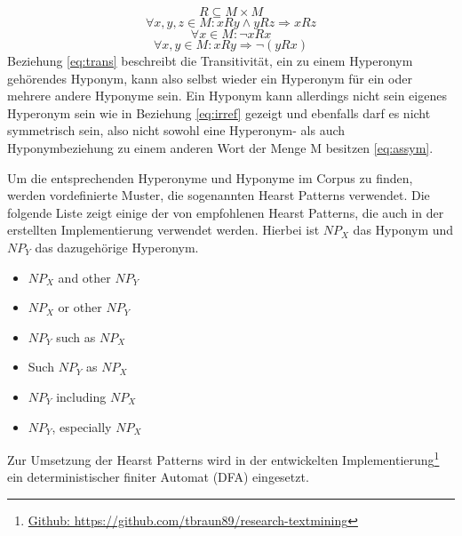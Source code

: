 \begin{equation}
  \label{eq:relation}
  R \subseteq M \times M
\end{equation}
\begin{equation}
  \label{eq:trans}
  \forall x, y, z \in M : xRy \land yRz \Rightarrow xRz
\end{equation}
\begin{equation}
  \label{eq:irref}
  \forall x \in M : \neg xRx
\end{equation}
\begin{equation}
  \label{eq:assym}
  \forall x, y \in M : xRy \Rightarrow \neg (yRx)
\end{equation}%
%
Beziehung \ref{eq:trans} beschreibt die Transitivität, ein zu einem Hyperonym gehörendes Hyponym, 
kann also selbst wieder ein Hyperonym für ein oder mehrere andere Hyponyme sein.
Ein Hyponym kann allerdings nicht sein eigenes Hyperonym sein wie in Beziehung \ref{eq:irref} gezeigt und ebenfalls darf es
nicht symmetrisch sein, also nicht sowohl eine Hyperonym- als auch Hyponymbeziehung zu einem anderen Wort
der Menge M besitzen \ref{eq:assym}.

Um die entsprechenden Hyperonyme und Hyponyme im Corpus zu finden, werden vordefinierte Muster, die sogenannten Hearst Patterns
verwendet. Die folgende Liste zeigt einige der von  empfohlenen Hearst Patterns, die auch in der erstellten
Implementierung verwendet werden. Hierbei ist $NP_{X}$ das Hyponym und $NP_{Y}$ das dazugehörige Hyperonym. \cite{bib:Snow2004}

\begin{itemize}
\item $NP_{X}$ and other $NP_{Y}$
\item $NP_{X}$ or other $NP_{Y}$
\item $NP_{Y}$ such as $NP_{X}$
\item Such $NP_{Y}$ as $NP_{X}$
\item $NP_{Y}$ including $NP_{X}$
\item $NP_{Y}$, especially $NP_{X}$
\end{itemize}%
%
Zur Umsetzung der Hearst Patterns wird in der entwickelten Implementierung\footnote{\href{https://github.com/tbraun89/research-textmining}{Github:
 https://github.com/tbraun89/research-textmining}} ein deterministischer finiter Automat (DFA) eingesetzt. 
